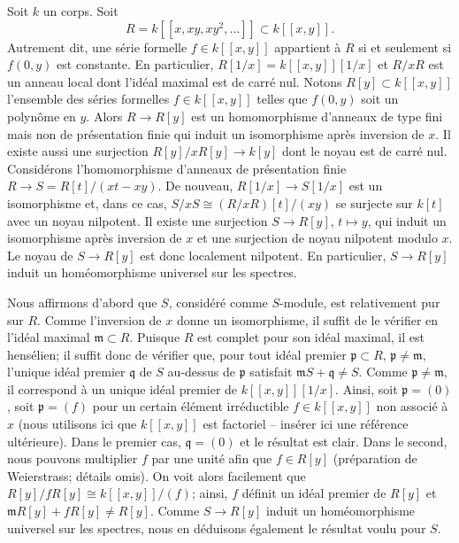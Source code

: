 \noindent
Soit $k$ un corps. Soit
$$
R = k[[x, xy, xy^2, \ldots]] \subset k[[x, y]].
$$
Autrement dit, une série formelle $f \in k[[x, y]]$ appartient à $R$ si et seulement si
$f(0, y)$ est constante. En particulier, $R[1/x] = k[[x, y]][1/x]$
et $R/xR$ est un anneau local dont l'idéal maximal est de carré
nul. Notons $R[y] \subset k[[x, y]]$ l'ensemble des séries formelles
$f \in k[[x, y]]$ telles que $f(0, y)$ soit un polynôme en $y$. Alors
$R \to R[y]$ est un homomorphisme d'anneaux de type fini mais non de présentation finie
qui induit un isomorphisme après inversion de $x$. Il existe aussi une
surjection $R[y]/xR[y] \to k[y]$ dont le noyau est de carré nul. Considérons
l'homomorphisme d'anneaux de présentation finie $R \to S = R[t]/(xt - xy)$.
De nouveau, $R[1/x] \to S[1/x]$ est un isomorphisme et, dans ce cas,
$S/xS \cong (R/xR)[t]/(xy)$ se surjecte sur $k[t]$ avec un noyau nilpotent.
Il existe une surjection $S \to R[y]$, $t \longmapsto y$, qui induit
un isomorphisme après inversion de $x$ et une surjection de noyau nilpotent
modulo $x$. Le noyau de $S \to R[y]$ est donc localement nilpotent.
En particulier, $S \to R[y]$ induit un homéomorphisme universel sur les spectres.

\medskip\noindent
Nous affirmons d'abord que $S$, considéré comme $S$-module, est relativement pur
sur $R$. Comme l'inversion de $x$ donne un isomorphisme, il suffit
de le vérifier en l'idéal maximal $\mathfrak m \subset R$. Puisque
$R$ est complet pour son idéal maximal, il est hensélien;
il suffit donc de vérifier que, pour tout idéal premier $\mathfrak p \subset R$,
$\mathfrak p \not = \mathfrak m$, l'unique idéal premier $\mathfrak q$
de $S$ au-dessus de $\mathfrak p$ satisfait
$\mathfrak mS + \mathfrak q \not = S$. Comme $\mathfrak p \not = \mathfrak m$,
il correspond à un unique idéal premier de $k[[x, y]][1/x]$. Ainsi,
soit $\mathfrak p = (0)$, soit $\mathfrak p = (f)$ pour un certain
élément irréductible $f \in k[[x, y]]$ non associé à $x$
(nous utilisons ici que $k[[x, y]]$ est factoriel -- insérer ici une référence ultérieure).
Dans le premier cas, $\mathfrak q = (0)$ et le résultat est clair. Dans le
second, nous pouvons multiplier $f$ par une unité afin que $f \in R[y]$
(préparation de Weierstrass; détails omis). On voit alors facilement que
$R[y]/fR[y] \cong k[[x, y]]/(f)$; ainsi, $f$ définit un idéal premier
de $R[y]$ et $\mathfrak mR[y] + fR[y] \not = R[y]$.
Comme $S \to R[y]$ induit un homéomorphisme universel sur les spectres, nous en déduisons
également le résultat voulu pour $S$.

